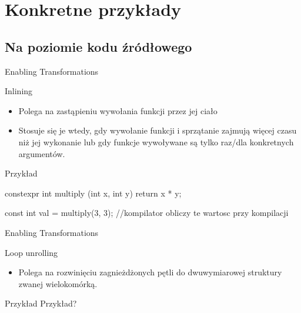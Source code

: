 \section{Konkretne przykłady} %
\subsection{Na poziomie kodu źródłowego}
\begin{frame}[fragile]{Enabling Transformations}
	\begin{block}{Inlining}
		\begin{itemize}
		 \item Polega na zastąpieniu wywołania funkcji przez jej ciało
		 \item Stosuje się je wtedy, gdy wywołanie funkcji i sprzątanie zajmują więcej czasu niż jej 
		 wykonanie lub gdy funkcje wywoływane są tylko raz/dla konkretnych argumentów.
		\end{itemize}
	\end{block}
	\begin{block}{Przykład}
		\begin{cpp}
		 constexpr int multiply (int x, int y)
		{
        return x * y;
		}
		
		const int val = multiply(3, 3); //kompilator obliczy te wartosc przy kompilacji
		\end{cpp}

	\end{block}
\end{frame}
\begin{frame}[fragile]{Enabling Transformations}
	\begin{block}{Loop unrolling}
		\begin{itemize}
		 \item Polega na rozwinięciu zagnieżdżonych pętli do dwuwymiarowej struktury zwanej
		 wielokomórką.
		\end{itemize}
	\end{block}
	\begin{block}{Przykład}
		Przykład?
	\end{block}
\end{frame}
